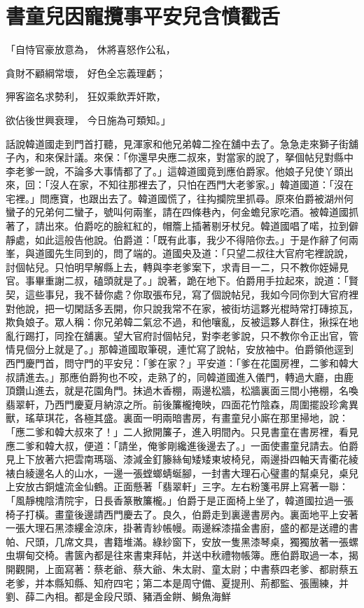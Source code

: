 %

\chapter{書童兒因寵攬事\KG 平安兒含憤戳舌}

「自恃官豪放意為，  休將喜怒作公私，

貪財不顧綱常壞，  好色全忘義理虧；

狎客盜名求勢利，  狂奴乘飲弄奸欺，

欲佔後世興衰理，  今日施為可類知。」

話說韓道國走到門首打聽，見渾家和他兄弟韓二拴在舖中去了。急急走來獅子街舖子內，和來保計議。來保：「你還早央應二叔來，對當家的說了，拏個帖兒對縣中李老爹一說，不論多大事情都了了。」這韓道國竟到應伯爵家。他娘子兒使丫頭出來，回：「沒人在家，不知往那裡去了，只怕在西門大老爹家。」韓道國道：「沒在宅裡。」問應寶，也跟出去了。韓道國慌了，往抅攔院里抓尋。原來伯爵被湖州何蠻子的兄弟何二蠻子，號叫何兩峯，請在四條巷內，何金蟾兒家吃酒。被韓道國抓著了，請出來。伯爵吃的臉紅紅的，帽簷上插著剔牙杖兒。韓道國唱了喏，拉到僻靜處，如此這般告他說。伯爵道：「既有此事，我少不得陪你去。」于是作辭了何兩峯，與道國先生同到的，問了端的。道國央及道：「只望二叔往大官府宅裡說說，討個帖兒。只怕明早解縣上去，轉與李老爹案下，求青目一二，只不教你姪婦見官。事畢重謝二叔，磕頭就是了。」說著，跪在地下。伯爵用手拉起來，說道：「賢契，這些事兒，我不替你處？你取張布兒，寫了個說帖兒，我如今同你到大官府裡對他說，把一切閑話多丟開，你只說我常不在家，被街坊這夥光棍時常打磚掠瓦，欺負娘子。眾人稱：你兄弟韓二氣忿不過，和他嚷亂，反被這夥人群住，揪採在地亂行踢打，同拴在舖裏。望大官府討個帖兒，對李老爹說，只不教你令正出官，管情見個分上就是了。」那韓道國取筆硯，連忙寫了說帖，安放袖中。伯爵領他逕到西門慶門首，問守門的平安兒：「爹在家？」平安道：「爹在花園房裡，二爹和韓大叔請進去。」那應伯爵狗也不咬，走熟了的，同韓道國進入儀門，轉過大廳，由鹿頂鑽山進去，就是花園角門。抹過木香棚，兩邊松牆，松牆裏面三間小捲棚，名喚翡翠軒，乃西門慶夏月納涼之所。前後簾櫳掩映，四面花竹陰森，周圍擺設珍禽異獸，瑤草琪花，各極其盛。裏面一明兩暗書房，有畫童兒小廝在那里掃地，說：「應二爹和韓大叔來了！」二人掀開簾子，進入明間內。只見書童在書房裡，看見應二爹和韓大叔，便道：「請坐，俺爹剛纔進後邊去了。」一面使畫童兒請去。伯爵見上下放著六把雲南瑪瑙、漆減金釘籐絲甸矮矮東坡椅兒，兩邊掛四軸天青衢花綾裱白綾邊名人的山水，一邊一張螳螂蜻蜒腳，一封書大理石心璧畫的幫桌兒，桌兒上安放古銅爐流金仙鶴。正面懸著「翡翠軒」三字。左右粉箋弔屏上寫著一聯：「風靜槐陰清院宇，日長香篆散簾櫳。」伯爵于是正面椅上坐了，韓道國拉過一張椅子打橫。畫童後邊請西門慶去了。良久，伯爵走到裏邊書房內。裏面地平上安著一張大理石黑漆縷金涼床，掛著青紗帳幔。兩邊綵漆描金書廚，盛的都是送禮的書帕、尺頭，几席文具，書籍堆滿。綠紗窗下，安放一隻黑漆琴桌，獨獨放著一張螺虫塀甸交椅。書篋內都是往來書柬拜帖，并送中秋禮物帳簿。應伯爵取過一本，揭開觀開，上面寫著：蔡老爺、蔡大爺、朱太尉、童太尉；中書蔡四老爹、都尉蔡五老爹，并本縣知縣、知府四宅；第二本是周守備、夏提刑、荊都監、張團練，并劉、薛二內相。都是金段尺頭、豬酒金餅、鰣魚海鮮 